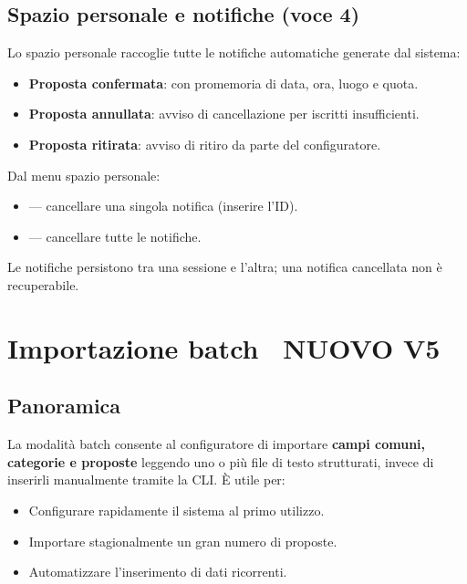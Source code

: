 \documentclass[12pt,a4paper,oneside]{report}
\newcommand{\badge}[2]{\colorbox{#1}{\small\sffamily\bfseries\color{white}~#2~}}
\newcommand{\tasto}[1]{\fbox{\small\ttfamily#1}}
\begin{document}
\section{Spazio personale e notifiche (voce 4)}

Lo spazio personale raccoglie tutte le notifiche automatiche generate dal sistema:
\begin{itemize}
  \item \textbf{Proposta confermata}: con promemoria di data, ora, luogo e quota.
  \item \textbf{Proposta annullata}: avviso di cancellazione per iscritti insufficienti.
  \item \textbf{Proposta ritirata}: avviso di ritiro da parte del configuratore.
\end{itemize}

Dal menu spazio personale:
\begin{itemize}
  \item \tasto{c} — cancellare una singola notifica (inserire l'ID).
  \item \tasto{t} — cancellare tutte le notifiche.
\end{itemize}

Le notifiche persistono tra una sessione e l'altra; una notifica cancellata non è recuperabile.

\chapter{Importazione batch \texorpdfstring{\textnormal{\badge{VERDE}{NUOVO V5}}}{[NUOVO V5]}}
\label{cap:batch}

\section{Panoramica}

La modalità batch consente al configuratore di importare \textbf{campi comuni, categorie e proposte} leggendo uno o più file di testo strutturati, invece di inserirli manualmente tramite la CLI. È utile per:
\begin{itemize}
  \item Configurare rapidamente il sistema al primo utilizzo.
  \item Importare stagionalmente un gran numero di proposte.
  \item Automatizzare l'inserimento di dati ricorrenti.
\end{itemize}
\end{document}
